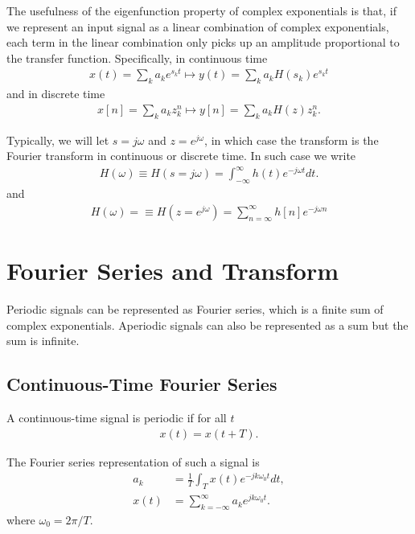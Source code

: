 \documentclass{revtex4-2}
\begin{document}
The usefulness of the eigenfunction property of complex exponentials is that, if we represent
an input signal as a linear combination of complex exponentials, each term in the linear combination
only picks up an amplitude proportional to the transfer function. Specifically, in continuous time
\begin{align}
    x(t) = \sum_k a_k e^{s_kt} \longmapsto y(t) = \sum_k a_k H(s_k) e^{s_kt}
\end{align}
and in discrete time
\begin{align}
    x[n] = \sum_k a_k z_k^n \longmapsto y[n] = \sum_k a_k H(z) z_k^n. 
\end{align}

Typically, we will let $s = j\omega$ and $z = e^{j\omega}$, in which case the transform is the Fourier transform in continuous or discrete time. In such case we write
\begin{align}
    H(\omega) \equiv H(s = j\omega) = \int_{-\infty}^\infty h(t) e^{-j\omega t} dt.
\end{align}
and
\begin{align}
    H(\omega) = \equiv H(z = e^{j\omega}) = \sum_{n=\infty}^\infty h[n] e^{-j\omega n}
\end{align}


\section{Fourier Series and Transform}

Periodic signals can be represented as Fourier series, which is a finite sum of complex exponentials.
Aperiodic signals can also be represented as a sum but the sum is infinite.

\subsection{Continuous-Time Fourier Series}

A continuous-time signal is periodic if for all $t$
\begin{align}
    x(t) = x(t + T).
\end{align}

The Fourier series representation of such a signal is
\begin{align}
    a_k &= \frac{1}{T} \int_T x(t) e^{-jk\omega_0t}dt, \label{eq:ctfs_ft}\\
    x(t) &= \sum_{k=-\infty}^\infty a_k e^{jk\omega_0t}. \label{eq:ctfs_ift}
\end{align}
where $\omega_0 = 2\pi/T$.
\end{document}
